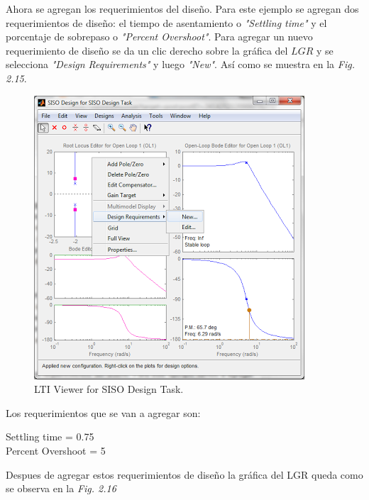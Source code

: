\documentclass[a4paper,12pt,twoside]{proyectotanquesecci}
\begin{document}
Ahora se agregan los requerimientos del diseño. Para este ejemplo se agregan dos requerimientos de diseño: el tiempo de asentamiento o \textit{"Settling time"} y el porcentaje de sobrepaso o \textit{"Percent Overshoot"}. Para agregar un nuevo requerimiento de diseño se da un clic derecho sobre la gráfica del $LGR$ y se selecciona \textit{"Design Requirements"} y luego \textit{"New"}. Así como se muestra en la \textit{Fig. 2.15}. \\

\begin{figure}[h]
\centering
\includegraphics[scale=0.6]{Ventana9}
\renewcommand{\figurename}{Fig.}
\caption{LTI Viewer for SISO Design Task.}
\label{LTI Viewer for SISO Design Task.}
\end{figure}

Los requerimientos que se van a agregar son:

\begin{center}
Settling time = 0.75 \\
Percent Overshoot = 5 \\
\end{center}

Despues de agregar estos requerimientos de diseño la gráfica del LGR queda como se observa en la \textit{Fig. 2.16} \\
\end{document}
